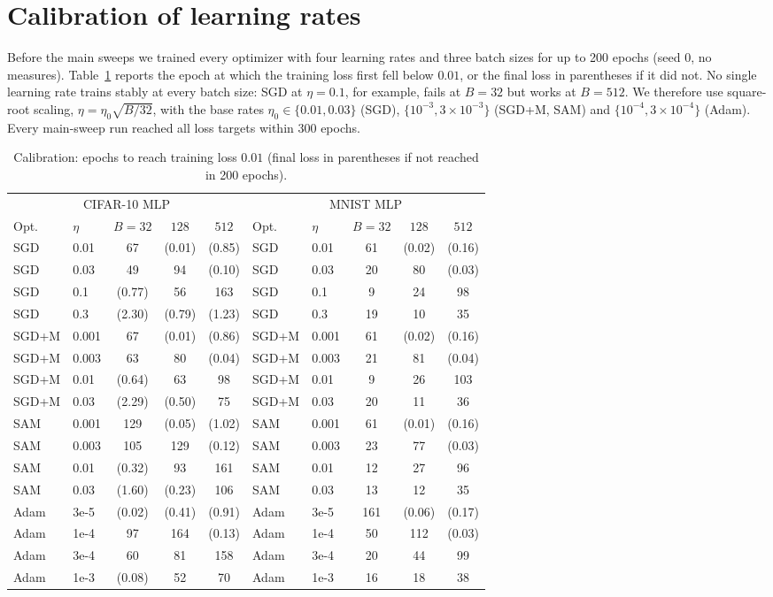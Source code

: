 \documentclass[10pt]{article}
\theoremstyle{remark}
\begin{document}
\section{Calibration of learning rates}\label{app:calibration}
Before the main sweeps we trained every optimizer with four learning rates and three batch sizes for up to 200 epochs (seed 0, no measures). Table~\ref{tab:calib} reports the epoch at which the training loss first fell below $0.01$, or the final loss in parentheses if it did not. No single learning rate trains stably at every batch size: SGD at $\eta=0.1$, for example, fails at $B=32$ but works at $B=512$. We therefore use square-root scaling, $\eta=\eta_0\sqrt{B/32}$, with the base rates $\eta_0\in\{0.01,0.03\}$ (SGD), $\{10^{-3},3{\times}10^{-3}\}$ (SGD+M, SAM) and $\{10^{-4},3{\times}10^{-4}\}$ (Adam). Every main-sweep run reached all loss targets within 300 epochs.
\begin{table}[h]
\centering
\small
\caption{Calibration: epochs to reach training loss $0.01$ (final loss in parentheses if not reached in 200 epochs).}
\label{tab:calib}
\begin{tabular}{llccc@{\qquad}llccc}
\toprule
\multicolumn{5}{c}{CIFAR-10 MLP} & \multicolumn{5}{c}{MNIST MLP}\\
\cmidrule(lr){1-5}\cmidrule(lr){6-10}
Opt. & $\eta$ & $B{=}32$ & $128$ & $512$ & Opt. & $\eta$ & $B{=}32$ & $128$ & $512$\\
\midrule
SGD & 0.01 & 67 & (0.01) & (0.85) & SGD & 0.01 & 61 & (0.02) & (0.16)\\
SGD & 0.03 & 49 & 94 & (0.10) & SGD & 0.03 & 20 & 80 & (0.03)\\
SGD & 0.1 & (0.77) & 56 & 163 & SGD & 0.1 & 9 & 24 & 98\\
SGD & 0.3 & (2.30) & (0.79) & (1.23) & SGD & 0.3 & 19 & 10 & 35\\
SGD+M & 0.001 & 67 & (0.01) & (0.86) & SGD+M & 0.001 & 61 & (0.02) & (0.16)\\
SGD+M & 0.003 & 63 & 80 & (0.04) & SGD+M & 0.003 & 21 & 81 & (0.04)\\
SGD+M & 0.01 & (0.64) & 63 & 98 & SGD+M & 0.01 & 9 & 26 & 103\\
SGD+M & 0.03 & (2.29) & (0.50) & 75 & SGD+M & 0.03 & 20 & 11 & 36\\
SAM & 0.001 & 129 & (0.05) & (1.02) & SAM & 0.001 & 61 & (0.01) & (0.16)\\
SAM & 0.003 & 105 & 129 & (0.12) & SAM & 0.003 & 23 & 77 & (0.03)\\
SAM & 0.01 & (0.32) & 93 & 161 & SAM & 0.01 & 12 & 27 & 96\\
SAM & 0.03 & (1.60) & (0.23) & 106 & SAM & 0.03 & 13 & 12 & 35\\
Adam & 3e-5 & (0.02) & (0.41) & (0.91) & Adam & 3e-5 & 161 & (0.06) & (0.17)\\
Adam & 1e-4 & 97 & 164 & (0.13) & Adam & 1e-4 & 50 & 112 & (0.03)\\
Adam & 3e-4 & 60 & 81 & 158 & Adam & 3e-4 & 20 & 44 & 99\\
Adam & 1e-3 & (0.08) & 52 & 70 & Adam & 1e-3 & 16 & 18 & 38\\
\bottomrule
\end{tabular}
\end{table}
\end{document}
